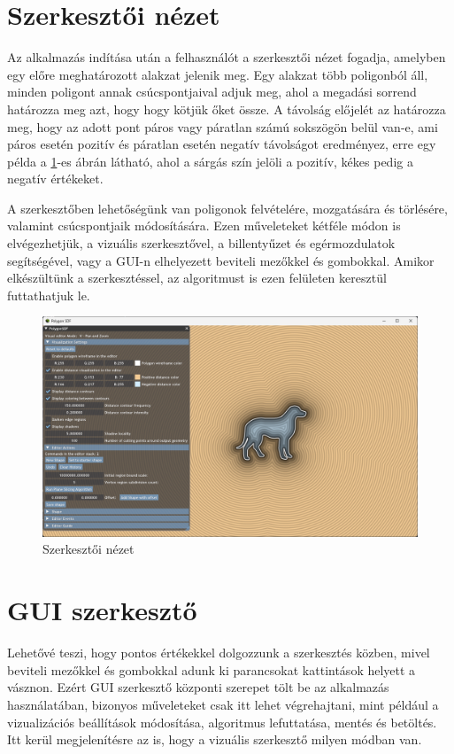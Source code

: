 \section{Szerkesztői nézet}

Az alkalmazás indítása után a felhasználót a szerkesztői nézet fogadja, amelyben egy előre meghatározott alakzat jelenik meg. Egy alakzat több poligonból áll, minden poligont annak csúcspontjaival adjuk meg, ahol a megadási sorrend határozza meg azt, hogy hogy kötjük őket össze. A távolság előjelét az határozza meg, hogy az adott pont páros vagy páratlan számú sokszögön belül van-e, ami páros esetén pozitív és páratlan esetén negatív távolságot eredményez, erre egy példa a \ref{fig:editor-1}-es ábrán látható, ahol a sárgás szín jelöli a pozitív, kékes pedig a negatív értékeket.

A szerkesztőben lehetőségünk van poligonok felvételére, mozgatására és törlésére, valamint csúcspontjaik módosítására. Ezen műveleteket kétféle módon is elvégezhetjük, a vizuális szerkesztővel, a billentyűzet és egérmozdulatok segítségével, vagy a GUI-n elhelyezett beviteli mezőkkel és gombokkal. Amikor elkészültünk a szerkesztéssel, az algoritmust is ezen felületen keresztül futtathatjuk le.

\begin{figure}[H]
    \centering
    \includegraphics[width=1\linewidth]{images/editor.png}
    \caption{Szerkesztői nézet}
    \label{fig:editor-1}
\end{figure}

\section{GUI szerkesztő}

Lehetővé teszi, hogy pontos értékekkel dolgozzunk a szerkesztés közben, mivel beviteli mezőkkel és gombokkal adunk ki parancsokat kattintások helyett a vásznon.
Ezért GUI szerkesztő központi szerepet tölt be az alkalmazás használatában, bizonyos műveleteket csak itt lehet végrehajtani, mint például a vizualizációs beállítások módosítása, algoritmus lefuttatása, mentés és betöltés. Itt kerül megjelenítésre az is, hogy a vizuális szerkesztő milyen módban van.

